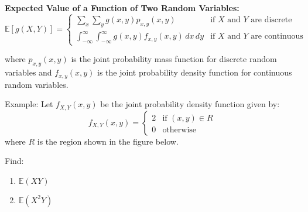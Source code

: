 \documentclass{article}
\begin{document}
    
    
    \textbf{Expected Value of a Function of Two Random Variables:}
    \[\mathbb{E}[g(X,Y)] = \begin{cases}
        \displaystyle\sum_{x} \sum_{y} g(x,y)p_{x,y}(x,y) & \text{if } X \text{ and } Y \text{ are discrete} \\[2ex]
        \displaystyle\int_{-\infty}^{\infty}\int_{-\infty}^{\infty} g(x,y)f_{x,y}(x,y) \, dx \, dy & \text{if } X \text{ and } Y \text{ are continuous}
    \end{cases}\]

    where $p_{x,y}(x,y)$ is the joint probability mass function for discrete random variables and $f_{x,y}(x,y)$ is the joint probability density function for continuous random variables.

    Example: Let $f_{X,Y}(x,y)$ be the joint probability density function given by:
    \[f_{X,Y}(x,y) = \begin{cases}
        2 & \text{if } (x,y) \in R \\
        0 & \text{otherwise}
    \end{cases}\]
    where $R$ is the region shown in the figure below.

    Find:
    \begin{enumerate}
        \item $\mathbb{E}(XY)$
        \item $\mathbb{E}(X^2Y)$
    \end{enumerate}

    \begin{center}
    \end{center}
\end{document}
